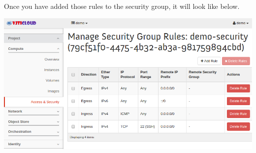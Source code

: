 \documentclass[letterpaper,10pt,english]{sphinxmanual}
\begin{document}
\begin{enumerate}
Once you have added those rules to the security group, it will look like below.

\includegraphics{as-after-adding-rule.png}

\end{enumerate}
\end{document}
